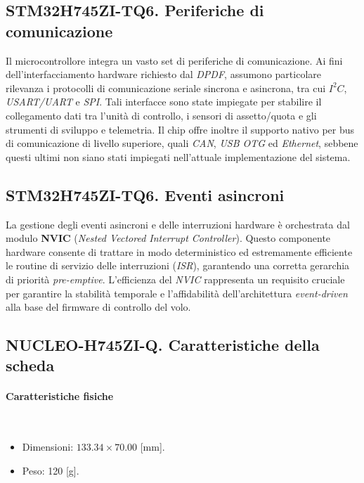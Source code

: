 \documentclass[11pt]{report}
\begin{document}
	\subsection{STM32H745ZI-TQ6. Periferiche di comunicazione}
	Il microcontrollore integra un vasto set di periferiche di comunicazione. Ai fini dell'interfacciamento hardware richiesto dal \textit{DPDF}, assumono particolare rilevanza i protocolli di comunicazione seriale sincrona e asincrona, tra cui $I^{2}C$, \textit{USART/UART} e \textit{SPI}. Tali interfacce sono state impiegate per stabilire il collegamento dati tra l'unità di controllo, i sensori di assetto/quota e gli strumenti di sviluppo e telemetria. Il chip offre inoltre il supporto nativo per bus di comunicazione di livello superiore, quali \textit{CAN}, \textit{USB OTG} ed \textit{Ethernet}, sebbene questi ultimi non siano stati impiegati nell'attuale implementazione del sistema.
	
	\subsection{STM32H745ZI-TQ6. Eventi asincroni}
	La gestione degli eventi asincroni e delle interruzioni hardware è orchestrata dal modulo \textbf{NVIC} (\textit{Nested Vectored Interrupt Controller}). Questo componente hardware consente di trattare in modo deterministico ed estremamente efficiente le routine di servizio delle interruzioni (\textit{ISR}), garantendo una corretta gerarchia di priorità \textit{pre-emptive}. L'efficienza del \textit{NVIC} rappresenta un requisito cruciale per garantire la stabilità temporale e l'affidabilità dell'architettura \textit{event-driven} alla base del firmware di controllo del volo.
	
	\subsection{NUCLEO-H745ZI-Q. Caratteristiche della scheda}
	
	\paragraph{Caratteristiche fisiche}\mbox{}\\
	\begin{itemize}
		\item Dimensioni: $133.34\times 70.00$ [mm].
		\item Peso: 120 [g].
	\end{itemize}
	
\end{document}
